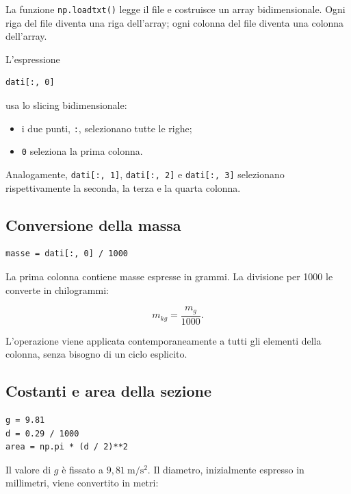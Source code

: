 \documentclass[11pt,a4paper]{book}
\begin{document}
La funzione \texttt{np.loadtxt()} legge il file e costruisce un array bidimensionale. Ogni riga del file diventa una riga dell'array; ogni colonna del file diventa una colonna dell'array.

L'espressione

\begin{lstlisting}
dati[:, 0]
\end{lstlisting}

usa lo slicing bidimensionale:

\begin{itemize}
    \item i due punti, \texttt{:}, selezionano tutte le righe;
    \item \texttt{0} seleziona la prima colonna.
\end{itemize}

Analogamente, \texttt{dati[:, 1]}, \texttt{dati[:, 2]} e \texttt{dati[:, 3]} selezionano rispettivamente la seconda, la terza e la quarta colonna.

\subsection{Conversione della massa}

\begin{lstlisting}
masse = dati[:, 0] / 1000
\end{lstlisting}

La prima colonna contiene masse espresse in grammi. La divisione per 1000 le converte in chilogrammi:

\begin{equation}
    m_{\si{kg}}=\frac{m_{\si{g}}}{1000}.
\end{equation}

L'operazione viene applicata contemporaneamente a tutti gli elementi della colonna, senza bisogno di un ciclo esplicito.

\subsection{Costanti e area della sezione}

\begin{lstlisting}
g = 9.81
d = 0.29 / 1000
area = np.pi * (d / 2)**2
\end{lstlisting}

Il valore di $g$ è fissato a $9{,}81\ \si{\metre\per\second\squared}$. Il diametro, inizialmente espresso in millimetri, viene convertito in metri:
\end{document}
